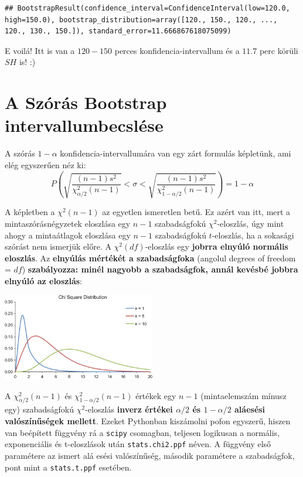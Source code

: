 \documentclass[
]{book}
\begin{document}
\begin{verbatim}
## BootstrapResult(confidence_interval=ConfidenceInterval(low=120.0, high=150.0), bootstrap_distribution=array([120., 150., 120., ..., 120., 130., 150.]), standard_error=11.666867618075099)
\end{verbatim}

E voilá! Itt is van a \(120-150\) perces konfidencia-intervallum és a \(11.7\) perc körüli \(SH\) is! :)

\section{A Szórás Bootstrap intervallumbecslése}\label{a-szuxf3ruxe1s-bootstrap-intervallumbecsluxe9se}

A szórás \(1-\alpha\) konfidencia-intervallumára van egy zárt formulás képletünk, ami elég egyszerűen néz ki: \[P\left(\sqrt{\frac{(n-1)s^2}{\chi^2_{\alpha/2}(n-1)}}< \sigma <\sqrt{\frac{(n-1)s^2}{\chi^2_{1-\alpha/2}(n-1)}}\right) = 1 - \alpha\]

A képletben a \(\chi^2(n-1)\) az egyetlen ismeretlen betű. Ez azért van itt, mert a mintaszórásnégyzetek eloszlása egy \(n-1\) szabadságfokú \(\chi^2\)-eloszlás, úgy mint ahogy a mintaátlagok eloszlása egy \(n-1\) szabadságfokú \(t\)-eloszlás, ha a sokasági szórást nem ismerjük előre.
A \(\chi^2(df)\)-eloszlás egy \textbf{jobrra elnyúló normális eloszlás}. Az \textbf{elnyúlás mértékét a szabadságfoka} (angolul degrees of freedom = \(df\)) \textbf{szabályozza: minél nagyobb a szabadságfok, annál kevésbé jobbra elnyúló az eloszlás}:

\includegraphics[width=0.5\textwidth,height=\textheight]{chisqrdist.jpg}

A \(\chi^2_{\alpha/2}(n-1)\) és \(\chi^2_{1-\alpha/2}(n-1)\) értékek egy \(n-1\) (mintaelemszám mínusz egy) szabadságfokú \(\chi^2\)-eloszlás \textbf{inverz értékei \(\alpha/2\) és \(1-\alpha/2\) aláesési valószínűségek mellett}. Ezeket Pythonban kiszámolni pofon egyszerű, hiszen van beépített függvény rá a \texttt{scipy} csomagban, teljesen logikusan a normális, exponenciális és t-eloszlások után \texttt{stats.chi2.ppf} néven. A függvény első paramétere az ismert alá esési valószínűség, második paramétere a szabadságfok, pont mint a \texttt{stats.t.ppf} esetében.
\end{document}

